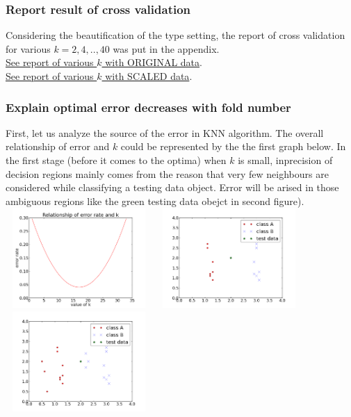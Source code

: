 \documentclass[11pt,a4paper]{article}
\newcommand{\htab}{\hspace*{0.63cm}}
\begin{document}
\subsubsection{Report result of cross validation}
Considering the beautification of the type setting, the report of cross validation for various $k = 2,4,..,40$ was put in the appendix. \\ 
\htab \hyperlink{kResultUNSCALED}{See report of various $k$ with ORIGINAL data}. \\
\htab \hyperlink{kResultSCALED}{See report of various $k$ with SCALED data}.\\
\newpage
\subsubsection{Explain optimal error decreases with fold number}
\htab First, let us analyze the source of the error in KNN algorithm. The overall relationship of error and $k$ could be represented by the the first graph below. In the first stage (before it comes to the optima) when $k$ is small, inprecision of decision regions mainly comes from the reason that very few neighbours are considered while classifying a testing data object. Error will be arised in those ambiguous regions like the green testing data obejct in second figure). \\
\includegraphics[width=2.2in,height=1.5in]{./picture/F0.png}
\includegraphics[width=2.2in,height=1.5in]{./picture/F1.png}
\includegraphics[width=2.2in,height=1.5in]{./picture/F3.png}\\
\end{document}
